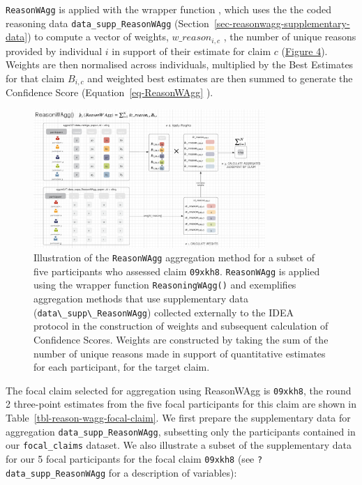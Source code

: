 \documentclass[article]{jss}
\newcommand{\fct}[1]{\code{#1()}}
\begin{document}
\texttt{ReasonWAgg} is applied with the wrapper function
\fct{ReasoningWAgg}, which uses the the coded reasoning data
\texttt{data\_supp\_ReasonWAgg}
(Section~\ref{sec-reasonwagg-supplementary-data}) to compute a vector of
weights, \(w\_reason_{i,c}\) , the number of unique reasons provided by
individual \(i\) in support of their estimate for claim \(c\)
(\protect\hyperlink{fig-ReasonWAgg}{Figure 4}). Weights are then
normalised across individuals, multiplied by the Best Estimates for that
claim \(B_{i,c}\) and weighted best estimates are then summed to
generate the Confidence Score (Equation~\ref{eq-ReasonWAgg} ).

\begin{figure}

{\centering \includegraphics[width=3.46in,height=\textheight]{images/img_ReasonWAgg.png}

}

\caption{\label{fig-ReasonWAgg}Illustration of the \texttt{ReasonWAgg}
aggregation method for a subset of five participants who assessed claim
\texttt{09xkh8}. \texttt{ReasonWAgg} is applied using the wrapper
function \texttt{ReasoningWAgg()} and exemplifies aggregation methods
that use supplementary data
(\texttt{data\textbackslash{}\_supp\textbackslash{}\_ReasonWAgg})
collected externally to the IDEA protocol in the construction of weights
and subsequent calculation of Confidence Scores. Weights are constructed
by taking the sum of the number of unique reasons made in support of
quantitative estimates for each participant, for the target claim.}

\end{figure}

The focal claim selected for aggregation using ReasonWAgg is
\texttt{09xkh8}, the round 2 three-point estimates from the five focal
participants for this claim are shown in
Table~\ref{tbl-reason-wagg-focal-claim}. We first prepare the
supplementary data for aggregation \texttt{data\_supp\_ReasonWAgg},
subsetting only the participants contained in our \texttt{focal\_claims}
dataset. We also illustrate a subset of the supplementary data for our 5
focal participants for the focal claim \texttt{09xkh8} (see
\texttt{?data\_supp\_ReasonWAgg} for a description of variables):
\end{document}
